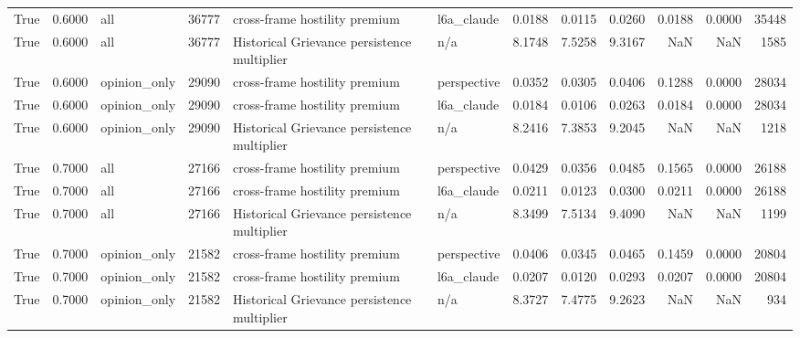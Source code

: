 \begin{longtable}{rrlrllrrrrrr}
True & 0.6000 & all & 36777 & cross-frame hostility premium & l6a\_claude & 0.0188 & 0.0115 & 0.0260 & 0.0188 & 0.0000 & 35448 \\
True & 0.6000 & all & 36777 & Historical Grievance persistence multiplier & n/a & 8.1748 & 7.5258 & 9.3167 & NaN & NaN & 1585 \\
True & 0.6000 & opinion\_only & 29090 & cross-frame hostility premium & perspective & 0.0352 & 0.0305 & 0.0406 & 0.1288 & 0.0000 & 28034 \\
True & 0.6000 & opinion\_only & 29090 & cross-frame hostility premium & l6a\_claude & 0.0184 & 0.0106 & 0.0263 & 0.0184 & 0.0000 & 28034 \\
True & 0.6000 & opinion\_only & 29090 & Historical Grievance persistence multiplier & n/a & 8.2416 & 7.3853 & 9.2045 & NaN & NaN & 1218 \\
True & 0.7000 & all & 27166 & cross-frame hostility premium & perspective & 0.0429 & 0.0356 & 0.0485 & 0.1565 & 0.0000 & 26188 \\
True & 0.7000 & all & 27166 & cross-frame hostility premium & l6a\_claude & 0.0211 & 0.0123 & 0.0300 & 0.0211 & 0.0000 & 26188 \\
True & 0.7000 & all & 27166 & Historical Grievance persistence multiplier & n/a & 8.3499 & 7.5134 & 9.4090 & NaN & NaN & 1199 \\
True & 0.7000 & opinion\_only & 21582 & cross-frame hostility premium & perspective & 0.0406 & 0.0345 & 0.0465 & 0.1459 & 0.0000 & 20804 \\
True & 0.7000 & opinion\_only & 21582 & cross-frame hostility premium & l6a\_claude & 0.0207 & 0.0120 & 0.0293 & 0.0207 & 0.0000 & 20804 \\
True & 0.7000 & opinion\_only & 21582 & Historical Grievance persistence multiplier & n/a & 8.3727 & 7.4775 & 9.2623 & NaN & NaN & 934 \\
\end{longtable}
